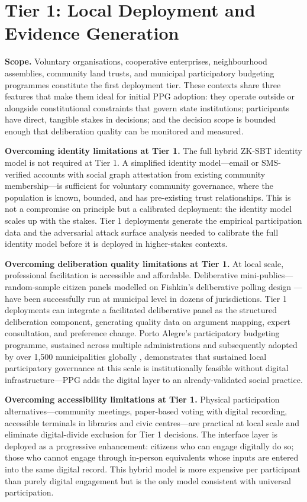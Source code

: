 \documentclass[12pt,a4paper,oneside]{report}
\begin{document}
\section{Tier 1: Local Deployment and Evidence Generation}

\textbf{Scope.} Voluntary organisations, cooperative enterprises, neighbourhood assemblies, community land trusts, and municipal participatory budgeting programmes constitute the first deployment tier. These contexts share three features that make them ideal for initial PPG adoption: they operate outside or alongside constitutional constraints that govern state institutions; participants have direct, tangible stakes in decisions; and the decision scope is bounded enough that deliberation quality can be monitored and measured.

\textbf{Overcoming identity limitations at Tier 1.} The full hybrid ZK-SBT identity model is not required at Tier 1. A simplified identity model---email or SMS-verified accounts with social graph attestation from existing community membership---is sufficient for voluntary community governance, where the population is known, bounded, and has pre-existing trust relationships. This is not a compromise on principle but a calibrated deployment: the identity model scales up with the stakes. Tier 1 deployments generate the empirical participation data and the adversarial attack surface analysis needed to calibrate the full identity model before it is deployed in higher-stakes contexts.

\textbf{Overcoming deliberation quality limitations at Tier 1.} At local scale, professional facilitation is accessible and affordable. Deliberative mini-publics---random-sample citizen panels modelled on Fishkin's deliberative polling design \citep{fishkin2018stanford}---have been successfully run at municipal level in dozens of jurisdictions. Tier 1 deployments can integrate a facilitated deliberative panel as the structured deliberation component, generating quality data on argument mapping, expert consultation, and preference change. Porto Alegre's participatory budgeting programme, sustained across multiple administrations and subsequently adopted by over 1,500 municipalities globally \citep{fung2006varieties}, demonstrates that sustained local participatory governance at this scale is institutionally feasible without digital infrastructure---PPG adds the digital layer to an already-validated social practice.

\textbf{Overcoming accessibility limitations at Tier 1.} Physical participation alternatives---community meetings, paper-based voting with digital recording, accessible terminals in libraries and civic centres---are practical at local scale and eliminate digital-divide exclusion for Tier 1 decisions. The interface layer is deployed as a progressive enhancement: citizens who can engage digitally do so; those who cannot engage through in-person equivalents whose inputs are entered into the same digital record. This hybrid model is more expensive per participant than purely digital engagement but is the only model consistent with universal participation.
\end{document}
